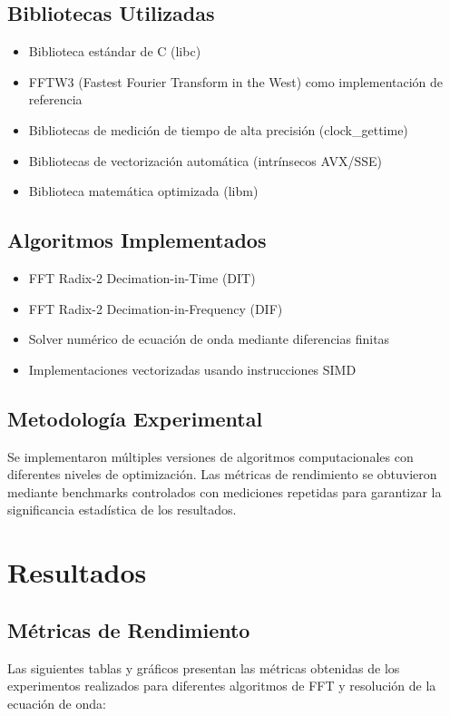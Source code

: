 \documentclass[a4paper]{article}
\begin{document}
\subsection{Bibliotecas Utilizadas}
\begin{itemize}
\item Biblioteca estándar de C (libc)
\item FFTW3 (Fastest Fourier Transform in the West) como implementación de referencia
\item Bibliotecas de medición de tiempo de alta precisión (clock\_gettime)
\item Bibliotecas de vectorización automática (intrínsecos AVX/SSE)
\item Biblioteca matemática optimizada (libm)
\end{itemize}

\subsection{Algoritmos Implementados}
\begin{itemize}
\item FFT Radix-2 Decimation-in-Time (DIT)
\item FFT Radix-2 Decimation-in-Frequency (DIF)
\item Solver numérico de ecuación de onda mediante diferencias finitas
\item Implementaciones vectorizadas usando instrucciones SIMD
\end{itemize}

\subsection{Metodología Experimental}
Se implementaron múltiples versiones de algoritmos computacionales con diferentes niveles de optimización. Las métricas de rendimiento se obtuvieron mediante benchmarks controlados con mediciones repetidas para garantizar la significancia estadística de los resultados.

\section{Resultados}

\subsection{Métricas de Rendimiento}

Las siguientes tablas y gráficos presentan las métricas obtenidas de los experimentos realizados para diferentes algoritmos de FFT y resolución de la ecuación de onda:
\end{document}
